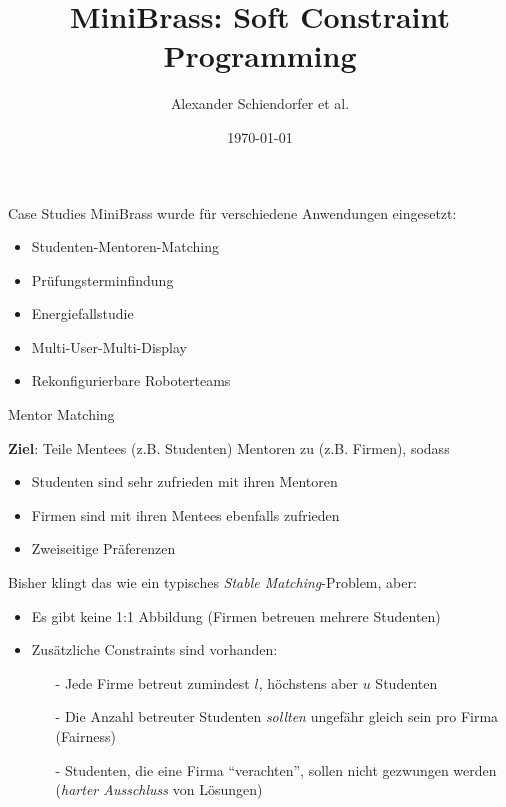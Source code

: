 \documentclass[handout,10pt,xcolor={dvipsnames},fleqn]{beamer}
\title{MiniBrass: Soft Constraint Programming}
\author{Alexander Schiendorfer et al.}
\date{\today}
\begin{document}
\titleframe




\begin{frame}{Case Studies}
MiniBrass wurde für verschiedene Anwendungen eingesetzt:

\vspace*{2ex}

\begin{itemize}
\item \alert<2->{Studenten-Mentoren-Matching}
\item \alert<2->{Prüfungsterminfindung}
\item \alert<2->{Energiefallstudie}
\item Multi-User-Multi-Display
\item Rekonfigurierbare Roboterteams
\end{itemize}
\end{frame}



\begin{frame}[fragile]{Mentor Matching}

\textbf{Ziel}: Teile Mentees (z.B. Studenten) Mentoren zu (z.B. Firmen), sodass
\begin{itemize}
\item Studenten sind sehr zufrieden mit ihren Mentoren
\item Firmen sind mit ihren Mentees ebenfalls zufrieden
\item Zweiseitige Präferenzen
\end{itemize}

\vspace*{2ex}

Bisher klingt das wie ein typisches \emph{Stable Matching}-Problem, aber:

\begin{itemize}
\item Es gibt keine 1:1 Abbildung (Firmen betreuen mehrere Studenten)
\item Zusätzliche Constraints sind vorhanden:
\begin{itemize}
\item[-] Jede Firme betreut zumindest $l$, höchstens aber $u$ Studenten
\item[-] Die Anzahl betreuter Studenten \emph{sollten} ungefähr gleich sein pro Firma (Fairness)
\item[-] Studenten, die eine Firma ``verachten'', sollen nicht gezwungen werden (\emph{harter Ausschluss} von Lösungen)
\end{itemize}
\end{itemize}
\end{frame}
\end{document}
